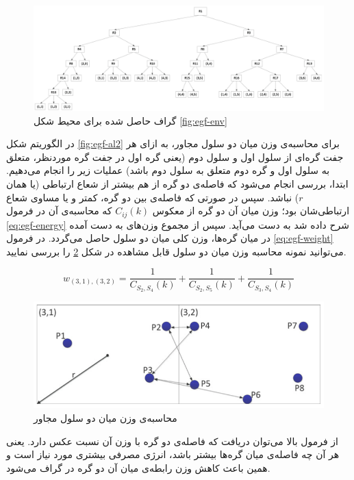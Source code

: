 \begin{figure}
	\centering
	\includegraphics[width=0.7\paperheight,angle=90,origin=c]{figs/egf-graph}
	\caption {گراف حاصل شده برای محیط شکل \ref{fig:egf-env}}
	\label{fig:egf-graph}
\end{figure}

\par
در الگوریتم شکل \ref{fig:egf-al2} برای محاسبه‌ی وزن میان دو سلول مجاور، به ازای هر جفت گره‌ای از سلول اول و سلول دوم (یعنی گره اول در جفت گره موردنظر، متعلق به سلول اول و گره دوم متعلق به سلول دوم باشد) عملیات زیر را انجام می‌دهیم. ابتدا، بررسی انجام می‌شود که فاصله‌ی دو گره از هم بیشتر از شعاع ارتباطی (یا همان $r$) نباشد. سپس در صورتی که فاصله‌ی بین دو گره، کمتر و یا مساوی شعاع ارتباطی‌شان بود؛ وزن میان آن دو گره از معکوس $C_{ij}(k)$  که محاسبه‌ی آن در فرمول \ref{eq:egf-energy} شرح داده شد به دست ‌می‌آید. سپس از مجموع وزن‌های به دست آمده در میان گره‌ها، وزن کلی میان دو سلول حاصل می‌گردد. در فرمول \ref{eq:egf-weight} می‌توانید نمونه محاسبه وزن میان دو سلول قابل مشاهده در شکل \ref{fig:egf-weight} را بررسی نمایید.

\begin{equation}
w_{(3,1),(3,2)} = \frac{1}{C_{S_2,S_4}(k)} + \frac{1}{C_{S_2,S_5}(k)} + \frac{1}{C_{S_3,S_4}(k)}
\label{eq:egf-weight}
\end{equation}

\begin{figure}
	\centering
	\includegraphics[width=0.7\linewidth]{figs/egf-weight}
	\caption {محاسبه‌ی وزن میان دو سلول مجاور}
	\label{fig:egf-weight}
\end{figure}

\par
از فرمول بالا می‌توان دریافت که فاصله‌ی دو گره با وزن آن نسبت عکس دارد. یعنی هر آن چه فاصله‌ی میان گره‌ها بیشتر باشد، انرژی مصرفی بیشتری مورد نیاز است و همین باعث کاهش وزن رابطه‌ی میان آن دو گره در گراف می‌شود.

